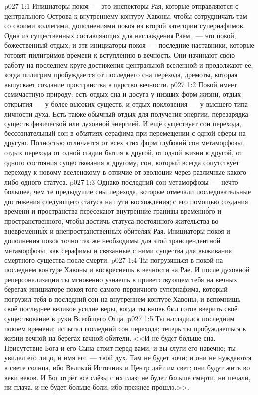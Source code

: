 \vs p027 1:1 Инициаторы покоя~--- это инспекторы Рая, которые отправляются с центрального Острова к внутреннему контуру Хавоны, чтобы сотрудничать там со своими коллегами, дополнениями покоя из второй категории супернафимов. Одна из существенных составляющих для наслаждения Раем,~--- это покой, божественный отдых; и эти инициаторы покоя~--- последние наставники, которые готовят пилигримов времени к вступлению в вечность. Они начинают свою работу на последнем круге достижения центральной вселенной и продолжают её, когда пилигрим пробуждается от последнего сна перехода, дремоты, которая выпускает создание пространства в царство вечности.
\vs p027 1:2 \pc Покой имеет семичастную природу: есть отдых сна и досуга у низших форм жизни, отдых открытия~--- у более высоких существ, и отдых поклонения~--- у высшего типа личности духа. Есть также обычный отдых для получения энергии, перезарядка существ физической или духовной энергией. И ещё существует сон перехода, бессознательный сон в объятиях серафима при перемещении с одной сферы на другую. Полностью отличается от всех этих форм глубокий сон метаморфозы, отдых перехода от одной стадии бытия к другой, от одной жизни к другой, от одного состояния существования к другому, сон, который всегда сопутствует переходу к новому вселенскому  в отличие от эволюции через различные  какого\hyp{}либо одного статуса.
\vs p027 1:3 Однако последний сон метаморфозы~--- нечто большее, чем те предыдущие сны перехода, которые отмечали последовательные достижения следующего статуса на пути восхождения; с его помощью создания времени и пространства пересекают внутренние границы временн\'ого и пространственного, чтобы достичь статуса постоянного жительства во вневременн\'ых и внепространственных обителях Рая. Инициаторы покоя и дополнения покоя точно так же необходимы для этой трансцендентной метаморфозы, как серафимы и связанные с ними существа для выживания смертного существа после смерти.
\vs p027 1:4 \pc Ты погрузишься в покой на последнем контуре Хавоны и воскреснешь в вечности на Рае. И после духовной реперсонализации ты мгновенно узнаешь в приветствующем тебя на вечных берегах инициаторе покоя того самого первичного супернафима, который погрузил тебя в последний сон на внутреннем контуре Хавоны; и вспомнишь своё последнее великое усилие веры, когда ты вновь был готов вверить своё существование в руки Всеобщего Отца.
\vs p027 1:5 Ты насладился последним покоем времени; испытал последний сон перехода; теперь ты пробуждаешься к жизни вечной на берегах вечной обители. <<И не будет больше сна. Присутствие Бога и его Сына стоит перед вами, и вы слуги его навечно; ты увидел его лицо, и имя его~--- твой дух. Там не будет ночи; и они не нуждаются в свете солнца, ибо Великий Источник и Центр даёт им свет; они будут жить во веки веков. И Бог отрёт все слёзы с их глаз; не будет больше смерти, ни печали, ни плача, и не будет больше боли, ибо прежнее прошло.>>.
